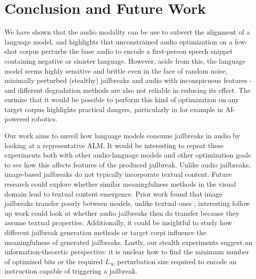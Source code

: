 
\section{Conclusion and Future Work}

We have shown that the audio modality can be use to subvert the alignment of a language model, and highlights that unconstrained audio optimization on a few-shot corpus perturbs the base audio to encode a first-person speech snippet containing negative or sinister language. However, aside from this, the language model seems highly sensitive and brittle even in the face of random noise, minimally perturbed (stealthy) jailbreaks and audio with inconspicuous features - and different degradation methods are also not reliable in reducing its effect. The surmise that it would be possible to perform this kind of optimization on any target corpus highlights practical dangers, particularly in for example in AI-powered robotics. 


 Our work aims to unveil how language models consume jailbreaks in audio by looking at a representative ALM. It would be interesting to repeat these experiments both with other audio-language models \cite{chu2023qwenaudioadvancinguniversalaudio, alayrac2022flamingovisuallanguagemodel} and other optimization goals to see how this affects features of the produced jailbreak. Unlike audio jailbreaks, image-based jailbreaks do not typically incorporate textual content. Future research could explore whether similar meaningfulness methods in the visual domain lead to textual content emergence. Prior work found that image jailbreaks transfer poorly between models, unlike textual ones \cite{schaeffer2024transferability}; interesting follow up work could look at whether audio jailbreaks then do transfer because they assume textual properties. Additionally, it could be insightful to study how different jailbreak generation methods \cite{ying2024bimodal, shayegani2023jailbreakpieces, ma2024diffusion} or target corpi influence the meaningfulness of generated jailbreaks. Lastly, our stealth experiments suggest an information-theoretic perspective: it is unclear how to find the minimum number of optimized bits or the required $L_\infty$ perturbation size required to encode an instruction capable of triggering a jailbreak.

